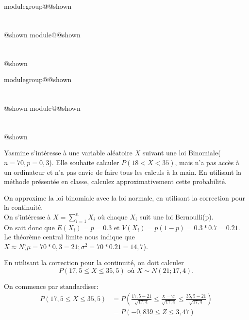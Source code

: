 \documentclass{Evaluation}
\makeatletter
\newcommand{\currentmodulekey}{}
\newcommand{\currentmoduletitle}{}
\newcommand{\currentgroupkey}{}
\newcommand{\currentgrouptitle}{}
\newcommand{\showmoduleifneeded}{%
  \ifx\currentgroupkey\empty\else
    \expandafter\ifx\csname modulegroup@\currentgroupkey @shown\endcsname\relax
      \section*{\currentgrouptitle}%
      \expandafter\gdef\csname modulegroup@\currentgroupkey @shown\endcsname{1}%
    \fi
  \fi
  \expandafter\ifx\csname module@\currentmodulekey @shown\endcsname\relax
    \section*{\currentmoduletitle}%
    \expandafter\gdef\csname module@\currentmodulekey @shown\endcsname{1}%
  \fi
}
\newenvironment{A22}{\showmoduleifneeded}{}
\makeatother
\begin{document}
\begin{questions}
\begin{A22}
\end{A22}

\begin{A22}
\question {} %
Yasmine s'intéresse à une variable aléatoire $X$ suivant une loi Binomiale($n=70,p=0,3$). Elle souhaite calculer ${P( 18 < X < 35)}$, mais n'a pas accès à un ordinateur et n'a pas envie de faire tous les calculs à la main. En utilisant la méthode présentée en classe, calculez approximativement cette probabilité. 

\begin{solution}
On approxime la loi binomiale avec la loi normale, en utilisant la correction pour la continuité.\\

On s'intéresse à $X = \sum_{i=1}^n X_i$ où chaque $X_i$ suit une loi Bernoulli(p).\\
On sait donc que $E(X_i) = p =0.3$ et $V(X_i) = p(1-p)=0.3*0.7=0.21$. \\
Le théorème central limite nous indique que $X \approx N(\mu = 70*0,3=21 ;  \sigma^2= 70*0.21=14,7$). 

En utilisant la correction pour la continuité, on doit calculer $$P(17,5 \le X \le 35,5) \mbox{ où } X \sim N(21; 17,4).$$

On commence par standardiser: 
\begin{align*}
P(17,5 \le X \le 35,5) &= P\left(\frac{17,5-21}{\sqrt{17,4}} \le \frac{X-21}{\sqrt{17,4}} \le \frac{35,5-21}{\sqrt{17,4}}\right) \\
&= P( -0,839 \leq Z \leq 3,47) 
\end{align*}


\end{solution}
\end{A22}
\end{questions}
\end{document}

